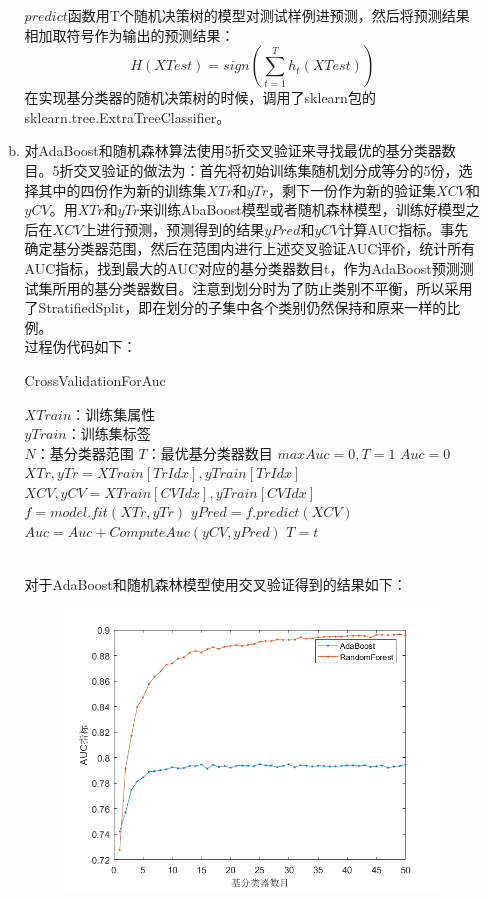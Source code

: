 \documentclass[a4paper,UTF8]{article}
\numberwithin{equation}{section}
\begin{document}
\begin{enumerate}[1.]
\begin{enumerate}[a.]
$predict$函数用T个随机决策树的模型对测试样例进预测，然后将预测结果相加取符号作为输出的预测结果：
\begin{equation}
H(XTest) = sign(\sum_{t=1}^{T}h_t(XTest))
\end{equation}
在实现基分类器的随机决策树的时候，调用了sklearn包的sklearn.tree.ExtraTreeClassifier。
\item 对AdaBoost和随机森林算法使用5折交叉验证来寻找最优的基分类器数目。5折交叉验证的做法为：首先将初始训练集随机划分成等分的5份，选择其中的四份作为新的训练集$XTr$和$yTr$，剩下一份作为新的验证集$XCV$和$yCV$。用$XTr$和$yTr$来训练AbaBoost模型或者随机森林模型，训练好模型之后在$XCV$上进行预测，预测得到的结果$yPred$和$yCV$计算AUC指标。事先确定基分类器范围，然后在范围内进行上述交叉验证AUC评价，统计所有AUC指标，找到最大的AUC对应的基分类器数目t，作为AdaBoost预测测试集所用的基分类器数目。注意到划分时为了防止类别不平衡，所以采用了StratifiedSplit，即在划分的子集中各个类别仍然保持和原来一样的比例。\\
过程伪代码如下：
\begin{algorithm}[!h]  
	\caption{CrossValidationForAuc}  
	\begin{algorithmic}[1]  
		\Require
		$XTrain$：训练集属性\\
		$yTrain$：训练集标签\\
		$N$：基分类器范围
		\Ensure  
		$T$：最优基分类器数目
		\State $maxAuc = 0, T = 1$
		\State $Auc = 0$
		\State $XTr, yTr = XTrain[TrIdx], yTrain[TrIdx]$
		\State $XCV, yCV = XTrain[CVIdx], yTrain[CVIdx]$
		\State $f = model.fit(XTr, yTr)$
		\State $yPred = f.predict(XCV)$
		\State $Auc = Auc + ComputeAuc(yCV,yPred)$
		\EndFor
		\State $T = t$
		\EndIf
		\EndFor
		\label{code:End3}  
	\end{algorithmic}  
\end{algorithm}\\
对于AdaBoost和随机森林模型使用交叉验证得到的结果如下：
\begin{figure}[!ht]
	\centering
	\includegraphics[scale=0.5]{auc.png}

\end{figure}
\end{enumerate}
\end{enumerate}
\end{document}
